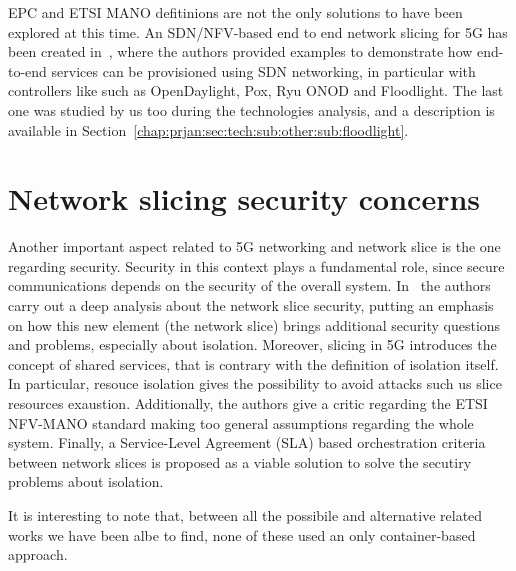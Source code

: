 EPC and ETSI MANO defitinions are not the only solutions to have been explored
at this time. An SDN/NFV-based end to end network slicing for 5G has been
created in~\cite{chartsias2017sdn}, where the authors provided examples to
demonstrate how end-to-end services can be provisioned using SDN networking, in
particular with controllers like such as OpenDaylight, Pox, Ryu ONOD and
Floodlight. The last one was studied by us too during the technologies analysis,
and a description is available in
Section~\ref{chap:prjan:sec:tech:sub:other:sub:floodlight}.

\section{Network slicing security concerns}

Another important aspect related to 5G networking and network slice is the one
regarding security. Security in this context plays a fundamental role, since
secure communications depends on the security of the overall system.
In~\cite{kotulski2017end} the authors carry out a deep analysis about the
network slice security, putting an emphasis on how this new element (the network
slice) brings additional security questions and problems, especially about
isolation. Moreover, slicing in 5G introduces the concept of shared services,
that is contrary with the definition of isolation itself. In particular, resouce
isolation gives the possibility to avoid attacks such us slice resources
exaustion. Additionally, the authors give a critic regarding the ETSI NFV-MANO
standard making too general assumptions regarding the whole system. Finally, a
Service-Level Agreement (SLA) based orchestration criteria between network
slices is proposed as a viable solution to solve the secutiry problems about
isolation.

\vspace{1cm}

\noindent It is interesting to note that, between all the possibile and alternative
related works we have been albe to find, none of these used an only
container-based approach.
